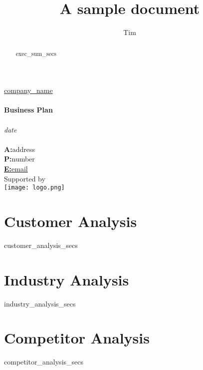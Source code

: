 \documentclass[11pt]{article}
\title{A sample document}
\author{Tim}
\begin{document}
\begin{titlepage}
\centering
\vspace*{\baselineskip}
{\Large \ul{ {{company_name}} }}\\[\baselineskip]
\vspace*{0.13\textheight}
\setlength{\unitlength}{0.6\textwidth}
{\color{BrickRed}}\\[\baselineskip] 
\textbf{\Large Business Plan }\\[\baselineskip]
{}\\[\baselineskip]
{\Large \textit{ {{date}} }}\\
{\color{BrickRed}}\\[\baselineskip]
{\small  \textbf{A:}{{address}}  }\\
{\small  \textbf{P:}{{number}}  }\\
{\small  \ul{\textbf{E:}{{email}}}}\\[\baselineskip]
\vfill
\raggedleft
{\small  Supported by  }\\
\vspace*{0.01\textheight}
\texttt{[image: logo.png]}\\[2ex]

\vspace*{1.5\baselineskip}
\end{titlepage}

\newpage
\renewcommand{\abstractname}{Executive Summary}

\begin{abstract}
{{ exec_sum_secs }}
\end{abstract}

\newpage
\tableofcontents

\newpage{}
\section{Customer Analysis}
{{ customer_analysis_secs }}

\newpage{}
\section{Industry Analysis}
{{ industry_analysis_secs }}

\newpage{}
\section{Competitor Analysis}
{{ competitor_analysis_secs }}
\end{document}
